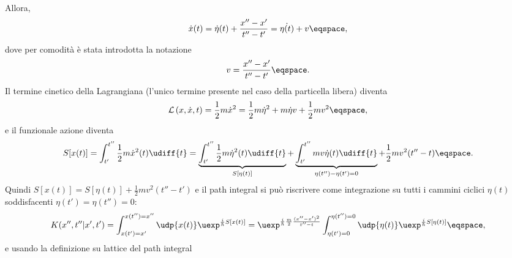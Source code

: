 Allora,
\begin{displaymath}
\dot{x}(t) = 
\dot{\eta}(t) + \frac{x''-x'}{t''-t'}  = \dot{\eta(t)}  + v \eqspace, 
\end{displaymath}
dove per comodit\`a \`e stata introdotta la notazione
\begin{displaymath}
 v = \frac{x''-x'}{t''-t'} \eqspace .
\end{displaymath}
Il termine cinetico della Lagrangiana (l'unico termine presente nel caso della
particella libera) diventa
\begin{displaymath}
\mathcal{L} \left( x, \dot{x} , t \right) = \frac{1}{2} m \dot{x}^{2} =
\frac{1}{2} m \dot{\eta}^{2}  + m  \dot{\eta} v + \frac{1}{2} m v^{2}  \eqspace, 
\end{displaymath}
e il funzionale azione diventa
\begin{displaymath}
S[x(t) ] = \int_{t'}^{t''} \frac{1}{2} m \dot{x}^{2} (t) \udiff{t}  
=  \underbrace{\int_{t'}^{t''}  \frac{1}{2} m  \dot{\eta}^{2} (t)
\udiff{t}}_{S[\eta(t)]}
+ \underbrace{\int_{t'}^{t''} m v \dot{\eta} (t) \udiff{t} }_{\eta(t'') -
\eta(t') = 0 } + \frac{1}{2} m v^{2} (t''-t) \eqspace .
\end{displaymath}
Quindi  $S[x(t)] = S[\eta(t)] + \frac{1}{2}mv^{2} (t''-t')$ e il path integral
si pu\`o riscrivere  come integrazione su tutti  i cammini ciclici $\eta(t)$
soddisfacenti $\eta(t') = \eta(t'') = 0$:
\begin{displaymath}
K(x'', t''|x',t') = \int_{x(t')=x'}^{x(t'')=x''}  \udp{x(t)} \uexp^{
\frac{i}{\hbar} S[x(t)]} = 
\uexp^{\frac{i}{\hbar} \frac{m}{2}\frac{(x''-x')^{2}}{t''-t} } 
\int_{\eta(t')=0}^{\eta(t'') = 0 } \udp{\eta(t)}
\uexp^{\frac{i}{\hbar} S[\eta(t)] } 
\eqspace ,
\end{displaymath}
e usando la definizione su lattice del path integral 

